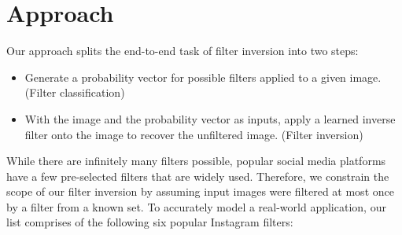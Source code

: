 \documentclass[11pt]{article}
\begin{document}
\section*{Approach}

Our approach splits the end-to-end task of filter inversion into two steps:
\begin{itemize}
    \item Generate a probability vector for possible filters applied to a given image. (Filter classification)
    \item With the image and the probability vector as inputs, apply a learned inverse filter onto the image to recover the unfiltered image. (Filter inversion)
\end{itemize}

While there are infinitely many filters possible, popular social media platforms have a few pre-selected filters that are widely used. Therefore, we constrain the scope of our filter inversion by assuming input images were filtered at most once by a filter from a known set. To accurately model a real-world application, our list comprises of the following six popular Instagram filters:
\end{document}
